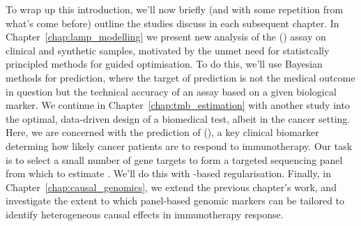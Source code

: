 \documentclass[thesis.tex]{subfiles}
\begin{document}
To wrap up this introduction, we'll now briefly (and with some repetition from what's come before) outline the studies discuss in each subsequent chapter. In Chapter~\ref{chap:lamp_modelling} we present new analysis of the  () assay on clinical and synthetic samples, motivated by the unmet need for statistcally principled methods for guided  optimisation. To do this, we'll use Bayesian methods for prediction, where the target of prediction is not the medical outcome in question but the technical accuracy of an assay based on a given biological marker. 
We continue in Chapter~\ref{chap:tmb_estimation} with another study into the optimal, data-driven design of a biomedical test, albeit in the cancer setting. Here, we are concerned with the prediction of  (), a key clinical biomarker determing how likely cancer patients are to respond to immunotherapy. Our task is to select a small number of gene targets to form a targeted  sequencing panel from which to estimate . We'll do this with -based regularisation.
Finally, in Chapter~\ref{chap:causal_genomics}, we extend the previous chapter's work, and investigate the extent to which panel-based genomic markers can be tailored to identify heterogeneous causal effects in immunotherapy response.

\dobib %
\end{document}
